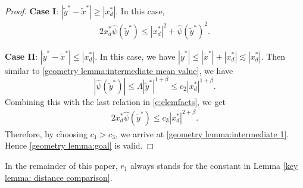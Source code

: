 \documentclass[12pt,a4paper]{amsart}
\numberwithin{equation}{section}
\theoremstyle{plain}
\newcommand{\wt}{\widetilde}
\newcommand{\1}{\mathbbm{1}}
\begin{document}
\begin{proof}
\textbf{Case I}: $|\wt y^* - \wt x^*| \ge |x_d^*|$. In this case, 
\begin{align*}
     2 x_d^* \widehat{\psi}(\wt y^*) \le |x_d^*|^2 +  
     \widehat{\psi}(\wt y^*)^2.
\end{align*}

\textbf{Case II}: $|\wt y^* - \wt x^*| \le |x_d^*|$. In this case, we have $|\wt y^*|  \le  |\wt x^*| + |x_d^*| \lesssim |x_d^*|$. Then similar to \eqref{geometry lemma:intermediate mean value}, we have 
\begin{equation}\label{geometry lemma:intermediate 2}
    |\widehat{\psi}(\wt y^*)| \le \Lambda |\wt y^*|^{1+\beta} \le c_2 |x_d^*|^{1+\beta}.
\end{equation}
Combining this with the last relation in \eqref{e:elemfacts}, we get
\begin{align*}
     2 x_d^* \widehat{\psi}(\wt y^*) \le c_3 |x_d^*|^{2+\beta}. 
\end{align*}
Therefore, by choosing $c_1 > c_3$, 
we arrive at \eqref{geometry lemma:intermediate 1}. Hence \eqref{geometry lemma:goal} is valid.
\end{proof}

In the remainder of this paper, $r_1$ always stands for the constant in Lemma \ref{key lemma: distance comparison}. 
\end{document}
